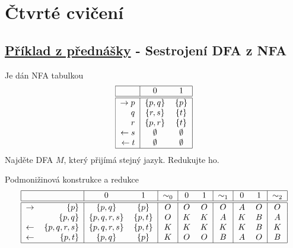 \section{Čtvrté cvičení}

\subsection{\href{https://youtu.be/Hbi2ao1mFBc?list=PLQL6z4JeTTQkLuzI78OTnfYBclE1g0UjS&t=1143}{Příklad z přednášky} - Sestrojení DFA z NFA}
Je dán NFA tabulkou
\[
    \begin{tabular}{|r|c c|}
        \hline
        & $0$ & $1$ \\ \hline \hline
        $\rightarrow p$& $\bc{p,q}$ & $\bc{p}$ \\
        $q$            & $\bc{r,s}$ & $\bc{t}$ \\
        $r$            & $\bc{p,r}$ & $\bc{t}$ \\
        $\leftarrow s$ & $\emptyset$ & $\emptyset$ \\
        $\leftarrow t$ & $\emptyset$ & $\emptyset$ \\
        \hline
    \end{tabular}
\]
Najděte DFA $M$, který přijímá stejný jazyk. Redukujte ho.

Podmonižinová konstrukce a redukce
\[
    \begin{tabular}{|r r|c c|c|c c|c|c c|c|c c|c|}
        \hline
        & $ $ & $0$ & $1$ & $\sim_0$ & $0$ & $1$ & $\sim_1$ & $0$ & $1$ & $\sim_2$ \\ \hline \hline
        $\rightarrow$  &$\bc{p}$       & $\bc{p,q}$     & $\bc{p}$   & $O$ & $O$ & $O$ & $O$ & $A$ & $O$ & $O$ \\
                       &$\bc{p,q}$     & $\bc{p,q,r,s}$ & $\bc{p,t}$ & $O$ & $K$ & $K$ & $A$ & $K$ & $B$ & $A$ \\
        $\leftarrow$   &$\bc{p,q,r,s}$ & $\bc{p,q,r,s}$ & $\bc{p,t}$ & $K$ & $K$ & $K$ & $K$ & $K$ & $B$ & $K$ \\
        $\leftarrow$   &$\bc{p,t}$     & $\bc{p,q}$     & $\bc{p}$   & $K$ & $O$ & $O$ & $B$ & $A$ & $O$ & $B$ \\
        \hline
    \end{tabular}
\]


